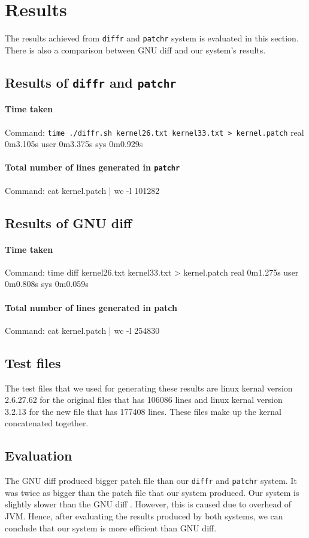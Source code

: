 \section{Results}

The results achieved from \texttt{diffr} and \texttt{patchr} system is evaluated in this section. There is also a comparison between GNU diff and our system's results. 

\subsection{Results of \texttt{diffr} and \texttt{patchr} }
\paragraph{Time taken}
Command: \texttt{time ./diffr.sh kernel26.txt kernel33.txt > kernel.patch}
real	0m3.105s
user	0m3.375s
sys	0m0.929s
\paragraph{Total number of lines generated in \texttt{patchr}}
Command: cat kernel.patch | wc -l
101282
  
\subsection{Results of GNU diff }
\paragraph{Time taken}
Command: time diff kernel26.txt kernel33.txt > kernel.patch
real	0m1.275s
user	0m0.808s
sys	0m0.059s
\paragraph{Total number of lines generated in patch}
Command: cat kernel.patch | wc -l
254830
  
\subsection{Test files}
The test files that we used for generating these results are linux kernal version 2.6.27.62 for the original files that has 106086 lines and linux kernal version 3.2.13 for the new file that has 177408 lines. These files make up the kernal concatenated together. 

\subsection{Evaluation}
The GNU diff produced bigger patch file than our \texttt{diffr} and \texttt{patchr} system. It was twice as bigger than the patch file that our system produced. Our system is slightly slower than the GNU diff . However, this is caused due to overhead of JVM. Hence, after evaluating the results produced by both systems, we can conclude that our system is more efficient than GNU diff.


